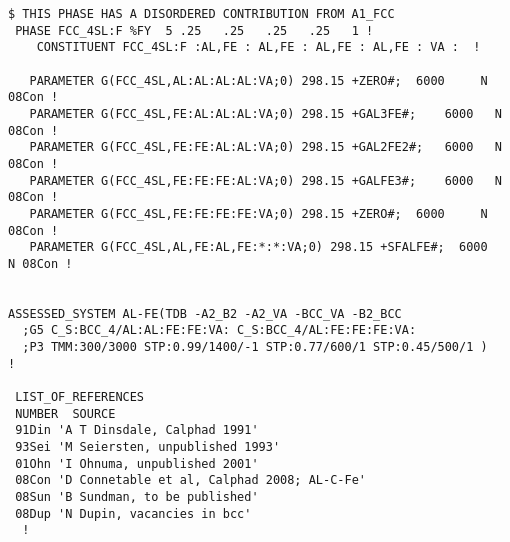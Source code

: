 \documentclass[12pt]{article}
\begin{document}
\begin{appendices}
{\begin{verbatim}
$ THIS PHASE HAS A DISORDERED CONTRIBUTION FROM A1_FCC                  
 PHASE FCC_4SL:F %FY  5 .25   .25   .25   .25   1 !
    CONSTITUENT FCC_4SL:F :AL,FE : AL,FE : AL,FE : AL,FE : VA :  !

   PARAMETER G(FCC_4SL,AL:AL:AL:AL:VA;0) 298.15 +ZERO#;  6000     N 08Con !
   PARAMETER G(FCC_4SL,FE:AL:AL:AL:VA;0) 298.15 +GAL3FE#;    6000   N 08Con !
   PARAMETER G(FCC_4SL,FE:FE:AL:AL:VA;0) 298.15 +GAL2FE2#;   6000   N 08Con !
   PARAMETER G(FCC_4SL,FE:FE:FE:AL:VA;0) 298.15 +GALFE3#;    6000   N 08Con !
   PARAMETER G(FCC_4SL,FE:FE:FE:FE:VA;0) 298.15 +ZERO#;  6000     N 08Con !
   PARAMETER G(FCC_4SL,AL,FE:AL,FE:*:*:VA;0) 298.15 +SFALFE#;  6000   N 08Con !


ASSESSED_SYSTEM AL-FE(TDB -A2_B2 -A2_VA -BCC_VA -B2_BCC 
  ;G5 C_S:BCC_4/AL:AL:FE:FE:VA: C_S:BCC_4/AL:FE:FE:FE:VA:
  ;P3 TMM:300/3000 STP:0.99/1400/-1 STP:0.77/600/1 STP:0.45/500/1 )
!

 LIST_OF_REFERENCES
 NUMBER  SOURCE
 91Din 'A T Dinsdale, Calphad 1991'
 93Sei 'M Seiersten, unpublished 1993'
 01Ohn 'I Ohnuma, unpublished 2001'
 08Con 'D Connetable et al, Calphad 2008; AL-C-Fe'
 08Sun 'B Sundman, to be published'
 08Dup 'N Dupin, vacancies in bcc'
  ! 
\end{verbatim}
}
  
\end{appendices}
\end{document}

